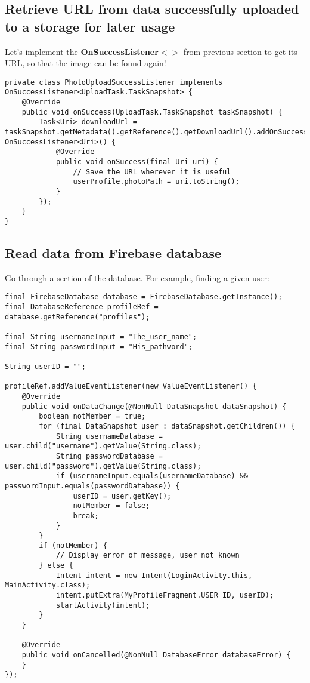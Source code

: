 \documentclass[11pt]{article}
\begin{document}
\subsection{Retrieve URL from data successfully uploaded to a storage for later usage}
Let's implement the \textbf{OnSuccessListener$<>$} from previous section to get its URL, so that the image can be found again!
\lstset{language = Java}
\begin{lstlisting}
private class PhotoUploadSuccessListener implements OnSuccessListener<UploadTask.TaskSnapshot> {
	@Override
	public void onSuccess(UploadTask.TaskSnapshot taskSnapshot) {
		Task<Uri> downloadUrl = taskSnapshot.getMetadata().getReference().getDownloadUrl().addOnSuccessListener(new OnSuccessListener<Uri>() {
			@Override
			public void onSuccess(final Uri uri) {
				// Save the URL wherever it is useful
				userProfile.photoPath = uri.toString();
			}
		});
	}
}
\end{lstlisting}

\subsection{Read data from Firebase database}
Go through a section of the database. For example, finding a given user:
\lstset{language = Java}
\begin{lstlisting}
final FirebaseDatabase database = FirebaseDatabase.getInstance();
final DatabaseReference profileRef = database.getReference("profiles");

final String usernameInput = "The_user_name";
final String passwordInput = "His_pathword";

String userID = "";

profileRef.addValueEventListener(new ValueEventListener() {
	@Override
	public void onDataChange(@NonNull DataSnapshot dataSnapshot) {
		boolean notMember = true;
		for (final DataSnapshot user : dataSnapshot.getChildren()) {
			String usernameDatabase = user.child("username").getValue(String.class);
			String passwordDatabase = user.child("password").getValue(String.class);
			if (usernameInput.equals(usernameDatabase) && passwordInput.equals(passwordDatabase)) {
				userID = user.getKey();
				notMember = false;
				break;
			}
		}
		if (notMember) {
			// Display error of message, user not known
		} else {
			Intent intent = new Intent(LoginActivity.this, MainActivity.class);
			intent.putExtra(MyProfileFragment.USER_ID, userID);
			startActivity(intent);
		}
	}
	
	@Override
	public void onCancelled(@NonNull DatabaseError databaseError) {
	}
});
\end{lstlisting}
\end{document}
